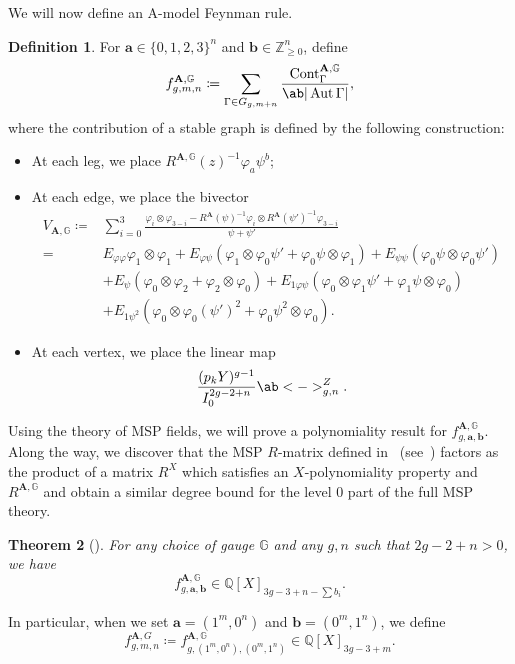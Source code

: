 \documentclass[10pt]{amsart}
\newtheorem{thm}{Theorem}[section]
\theoremstyle{definition}
\newtheorem{defn}[thm]{Definition}
\theoremstyle{remark}
\theoremstyle{plain}
\theoremstyle{definition}
\theoremstyle{remark}
\newcommand{\G}{\mathbb{G}}
\newcommand{\Z}{\mathbb{Z}}
\newcommand{\Q}{\mathbb{Q}}
\newcommand{\ba}{\mathbf{a}}
\newcommand{\bb}{\mathbf{b}}
\newcommand{\bA}{\mathbf{A}}
\newcommand{\on}[1]{\operatorname{#1}}
\newcommand{\1}{\mathbf{1}}
\newcommand{\2}{\mathbf{2}}
\newcommand{\3}{\mathbf{3}}
\DeclareMathOperator{\Aut}{Aut}
\numberwithin{equation}{section}
\begin{document}
We will now define an A-model Feynman rule.
\begin{defn}
    For $\ba \in \{0,1,2,3\}^n$ and $\bb \in \Z_{\geq 0}^n$, define
    \[ f_{g,m,n}^{\bA,\G} \coloneqq \sum_{\Gamma \in G_{g,m+n}} \frac{\on{Cont}_{\Gamma}^{\bA,\G}}{\ab|\Aut \Gamma|}, \]
    where the contribution of a stable graph is defined by the following construction:
    \begin{itemize}
        \item At each leg, we place $R^{\bA,\G}(z)^{-1} \varphi_a \psi^b$;
        \item At each edge, we place the bivector
            \begin{align*}
                V_{\bA,\G} \coloneqq{}& \sum_{i=0}^3 \frac{\varphi_i \otimes \varphi_{3-i} - R^{\bA}(\psi)^{-1} \varphi_i \otimes R^{\bA}(\psi')^{-1} \varphi_{3-i}}{\psi+\psi'} \\
                ={}& E_{\varphi\varphi} \varphi_1 \otimes \varphi_1 + E_{\varphi\psi} (\varphi_1 \otimes \varphi_0 \psi' + \varphi_0 \psi \otimes \varphi_1) + E_{\psi\psi} (\varphi_0\psi \otimes \varphi_0\psi') \\
                &+ E_{\psi} (\varphi_0 \otimes \varphi_2 + \varphi_2 \otimes \varphi_0) + E_{1\varphi\psi} (\varphi_0 \otimes \varphi_1 \psi' + \varphi_1 \psi \otimes \varphi_0) \\ 
                &+ E_{1\psi^2} (\varphi_0 \otimes \varphi_0 (\psi')^2 + \varphi_0 \psi^2 \otimes \varphi_0).
            \end{align*}
        \item At each vertex, we place the linear map
            \[ \frac{(p_k Y)^{g-1}}{I_0^{2g-2+n}}\ab<->_{g,n}^Z. \]
    \end{itemize}
\end{defn}

Using the theory of MSP fields, we will prove a polynomiality result for $f_{g,\ba,\bb}^{\bA, \G}$. Along the way, we discover that the MSP $R$-matrix defined in~\cite{polynomiality} (see~) factors as the product of a matrix $R^X$ which satisfies an $X$-polynomiality property and $R^{\bA, \G}$ and obtain a similar degree bound for the level $0$ part of the full MSP theory.
\begin{thm}[]\label{thm:amodelintro}
    For any choice of gauge $\G$ and any $g,n$ such that $2g-2+n > 0$, we have
    \[ f_{g,\ba,\bb}^{\bA, \G} \in \Q[X]_{3g-3+n-\sum b_i}. \]
\end{thm}
In particular, when we set $\ba = (1^m,0^n)$ and $\bb = (0^m,1^n)$, we define
\[ f_{g,m,n}^{\bA, G} \coloneqq f_{g,(1^m,0^n),(0^m,1^n)}^{\bA,\G} \in \Q[X]_{3g-3+m}. \]
\end{document}
